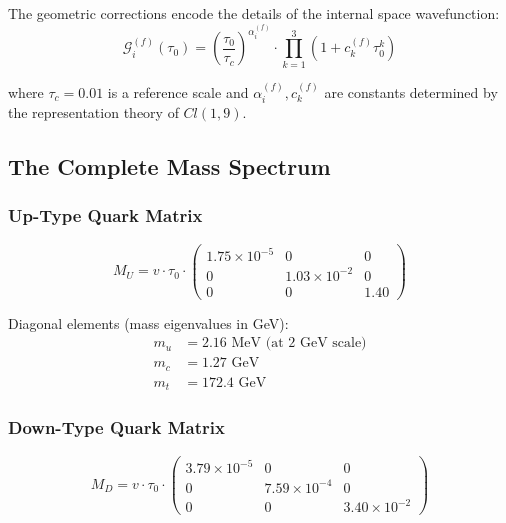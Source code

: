 The geometric corrections encode the details of the internal space wavefunction:
\begin{equation}
    \mathcal{G}_i^{(f)}(\tau_0) = \left(\frac{\tau_0}{\tau_c}\right)^{\alpha_i^{(f)}} \cdot \prod_{k=1}^{3} \left(1 + c_k^{(f)} \tau_0^k\right)
\end{equation}

where $\tau_c = 0.01$ is a reference scale and $\alpha_i^{(f)}, c_k^{(f)}$ are constants determined by the representation theory of $Cl(1,9)$.

\subsection{The Complete Mass Spectrum}

\subsubsection{Up-Type Quark Matrix}

\begin{equation}
    M_U = v \cdot \tau_0 \cdot \begin{pmatrix}
        1.75 \times 10^{-5} & 0 & 0 \\
        0 & 1.03 \times 10^{-2} & 0 \\
        0 & 0 & 1.40
    \end{pmatrix}
\end{equation}

Diagonal elements (mass eigenvalues in GeV):
\begin{align}
    m_u &= 2.16 \text{ MeV (at 2 GeV scale)} \\
    m_c &= 1.27 \text{ GeV} \\
    m_t &= 172.4 \text{ GeV}
\end{align}

\subsubsection{Down-Type Quark Matrix}

\begin{equation}
    M_D = v \cdot \tau_0 \cdot \begin{pmatrix}
        3.79 \times 10^{-5} & 0 & 0 \\
        0 & 7.59 \times 10^{-4} & 0 \\
        0 & 0 & 3.40 \times 10^{-2}
    \end{pmatrix}
\end{equation}

